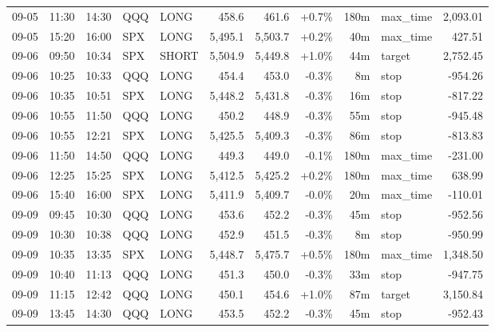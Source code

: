\documentclass[11pt,a4paper,twoside]{article}
\begin{document}
\begin{center}
\begin{longtable}{>{\color{txtmain}}l l l l l r r r r >{\color{txtmain}}l r}
09-05 & 11:30 & 14:30 & QQQ & LONG & 458.6 & 461.6 & \textcolor{wingreen}{+0.7\%} & 180m & max\_time & \textcolor{wingreen}{2,093.01} \\
09-05 & 15:20 & 16:00 & SPX & LONG & 5,495.1 & 5,503.7 & \textcolor{wingreen}{+0.2\%} & 40m & max\_time & \textcolor{wingreen}{427.51} \\
09-06 & 09:50 & 10:34 & SPX & SHORT & 5,504.9 & 5,449.8 & \textcolor{wingreen}{+1.0\%} & 44m & target & \textcolor{wingreen}{2,752.45} \\
09-06 & 10:25 & 10:33 & QQQ & LONG & 454.4 & 453.0 & \textcolor{lossred}{-0.3\%} & 8m & stop & \textcolor{lossred}{-954.26} \\
09-06 & 10:35 & 10:51 & SPX & LONG & 5,448.2 & 5,431.8 & \textcolor{lossred}{-0.3\%} & 16m & stop & \textcolor{lossred}{-817.22} \\
09-06 & 10:55 & 11:50 & QQQ & LONG & 450.2 & 448.9 & \textcolor{lossred}{-0.3\%} & 55m & stop & \textcolor{lossred}{-945.48} \\
09-06 & 10:55 & 12:21 & SPX & LONG & 5,425.5 & 5,409.3 & \textcolor{lossred}{-0.3\%} & 86m & stop & \textcolor{lossred}{-813.83} \\
09-06 & 11:50 & 14:50 & QQQ & LONG & 449.3 & 449.0 & \textcolor{lossred}{-0.1\%} & 180m & max\_time & \textcolor{lossred}{-231.00} \\
09-06 & 12:25 & 15:25 & SPX & LONG & 5,412.5 & 5,425.2 & \textcolor{wingreen}{+0.2\%} & 180m & max\_time & \textcolor{wingreen}{638.99} \\
09-06 & 15:40 & 16:00 & SPX & LONG & 5,411.9 & 5,409.7 & \textcolor{lossred}{-0.0\%} & 20m & max\_time & \textcolor{lossred}{-110.01} \\
09-09 & 09:45 & 10:30 & QQQ & LONG & 453.6 & 452.2 & \textcolor{lossred}{-0.3\%} & 45m & stop & \textcolor{lossred}{-952.56} \\
09-09 & 10:30 & 10:38 & QQQ & LONG & 452.9 & 451.5 & \textcolor{lossred}{-0.3\%} & 8m & stop & \textcolor{lossred}{-950.99} \\
09-09 & 10:35 & 13:35 & SPX & LONG & 5,448.7 & 5,475.7 & \textcolor{wingreen}{+0.5\%} & 180m & max\_time & \textcolor{wingreen}{1,348.50} \\
09-09 & 10:40 & 11:13 & QQQ & LONG & 451.3 & 450.0 & \textcolor{lossred}{-0.3\%} & 33m & stop & \textcolor{lossred}{-947.75} \\
09-09 & 11:15 & 12:42 & QQQ & LONG & 450.1 & 454.6 & \textcolor{wingreen}{+1.0\%} & 87m & target & \textcolor{wingreen}{3,150.84} \\
09-09 & 13:45 & 14:30 & QQQ & LONG & 453.5 & 452.2 & \textcolor{lossred}{-0.3\%} & 45m & stop & \textcolor{lossred}{-952.43} \\

\end{longtable}
\end{center}
\end{document}
